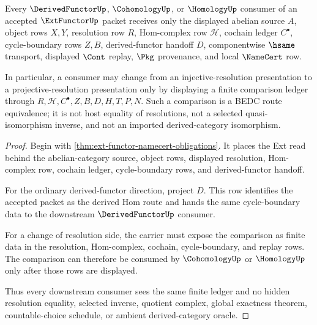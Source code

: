 \begin{theorem}
\label{thm:ext-functor-derived-functor-handoff}
Every $\DerivedFunctorUp$, $\CohomologyUp$, or $\HomologyUp$ consumer of an accepted $\ExtFunctorUp$ packet receives only the displayed abelian source $A$, object rows $X,Y$, resolution row $R$, Hom-complex row $\mathcal{H}$, cochain ledger $C^\bullet$, cycle-boundary rows $Z,B$, derived-functor handoff $D$, componentwise $\hsame$ transport, displayed $\Cont$ replay, $\Pkg$ provenance, and local $\NameCert$ row.

In particular, a consumer may change from an injective-resolution presentation to a projective-resolution presentation only by displaying a finite comparison ledger through $R,\mathcal{H},C^\bullet,Z,B,D,H,T,P,N$. Such a comparison is a BEDC route equivalence; it is not host equality of resolutions, not a selected quasi-isomorphism inverse, and not an imported derived-category isomorphism.
\end{theorem}
\begin{proof}
Begin with \autoref{thm:ext-functor-namecert-obligations}. It places the Ext read behind the abelian-category source, object rows, displayed resolution, Hom-complex row, cochain ledger, cycle-boundary rows, and derived-functor handoff.

For the ordinary derived-functor direction, project $D$. This row identifies the accepted packet as the derived Hom route and hands the same cycle-boundary data to the downstream $\DerivedFunctorUp$ consumer.

For a change of resolution side, the carrier must expose the comparison as finite data in the resolution, Hom-complex, cochain, cycle-boundary, and replay rows. The comparison can therefore be consumed by $\CohomologyUp$ or $\HomologyUp$ only after those rows are displayed.

Thus every downstream consumer sees the same finite ledger and no hidden resolution equality, selected inverse, quotient complex, global exactness theorem, countable-choice schedule, or ambient derived-category oracle.
\end{proof}


